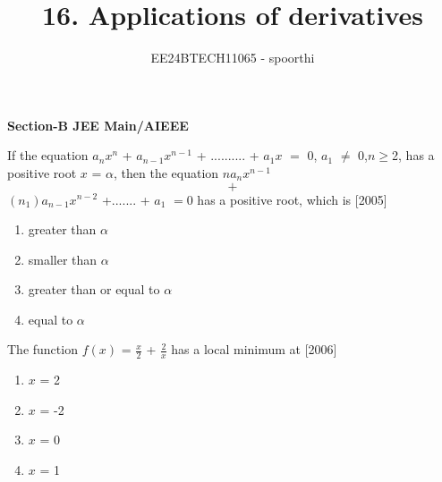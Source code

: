 \documentclass[journal,12pt,twocolumn]{IEEEtran}
\theoremstyle{remark}
\begin{document}



\title{16. Applications of derivatives}
\author{EE24BTECH11065 - spoorthi }
\maketitle
\newpage
\bigskip

\renewcommand{\thefigure}{\theenumi}
\renewcommand{\thetable}{\theenumi}
\begin{large}
\textbf{{Section-B JEE Main/AIEEE}}
\end{large}

    
    \item[11.] If the equation $a_nx^n$ + $a$$_{n-1}x^{n-1}$ + .......... + $a_1$$x$ $=$ 0, $a_1$ $\ne$ 0,$n$$\geq$2, has a positive root $x$ = $\alpha$, then the equation $n$$a_n$$x^{n-1}$ $$+$$ $(n_1)$$a_{n-1}$$x^{n-2}$ +....... + $a_1$ $=$0 has a positive root, which is 
    \hfill[2005]
    \begin{enumerate}
        \item greater than $\alpha$
        \item smaller than $\alpha$
        \item greater than or equal to $\alpha$
        \item equal to $\alpha$
        \end{enumerate}
        \item[12.] The function $f(x)$ = $\frac{x}{2}$ + $\frac{2}{x}$ has a local minimum at \hfill[2006]
        \begin{enumerate}
         \item $x$ = 2
        \item $x$ = -2
        \item $x$ = 0
        \item $x$ = 1
            
        \end{enumerate}
\end{document}
